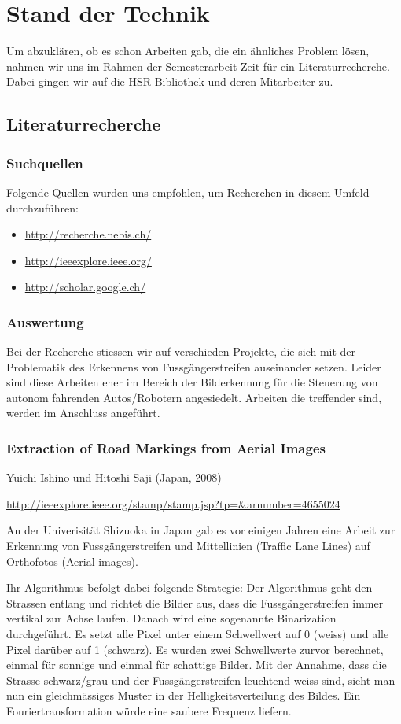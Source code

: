 \chapter{Stand der Technik}
Um abzuklären, ob es schon Arbeiten gab, die ein ähnliches Problem lösen, nahmen wir uns im Rahmen der Semesterarbeit Zeit für ein Literaturrecherche. Dabei gingen wir auf die HSR Bibliothek und deren Mitarbeiter zu.
\section{Literaturrecherche}
\subsection{Suchquellen}
Folgende Quellen wurden uns empfohlen, um Recherchen in diesem Umfeld durchzuführen:
\begin{itemize}
	\item \url{http://recherche.nebis.ch/}
    \item \url{http://ieeexplore.ieee.org/}
    \item \url{http://scholar.google.ch/}
\end{itemize}

\subsection{Auswertung}
Bei der Recherche stiessen wir auf verschieden Projekte, die sich mit der Problematik des Erkennens von Fussgängerstreifen auseinander setzen. Leider sind diese Arbeiten eher im Bereich der Bilderkennung für die Steuerung von autonom fahrenden Autos/Robotern angesiedelt. Arbeiten die treffender sind, werden im Anschluss angeführt.
\subsection{Extraction of Road Markings from Aerial Images}
Yuichi Ishino und Hitoshi Saji (Japan, 2008) \newline 

\onehalfspacing 
\url{http://ieeexplore.ieee.org/stamp/stamp.jsp?tp=\&arnumber=4655024}
\onehalfspacing

An der Univerisität Shizuoka in Japan gab es vor einigen Jahren eine Arbeit zur Erkennung von Fussgängerstreifen und Mittellinien (Traffic Lane Lines) auf Orthofotos (Aerial images).

Ihr Algorithmus befolgt dabei folgende Strategie:
Der Algorithmus geht den Strassen entlang und richtet die Bilder aus, dass die Fussgängerstreifen immer vertikal zur Achse laufen. Danach wird eine sogenannte Binarization durchgeführt. Es setzt alle Pixel unter einem Schwellwert auf 0 (weiss) und alle Pixel darüber auf 1 (schwarz). Es wurden zwei Schwellwerte zurvor berechnet, einmal für sonnige und einmal für schattige Bilder.
Mit der Annahme, dass die Strasse schwarz/grau und der Fussgängerstreifen leuchtend weiss sind, sieht man nun ein gleichmässiges Muster in der Helligkeitsverteilung des Bildes. Ein Fouriertransformation würde eine saubere Frequenz liefern.

